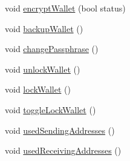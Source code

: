 \begin{DoxyCompactItemize}
void \mbox{\hyperlink{class_wallet_frame_a8a9a419ba3e249f29fe321f2d789b761}{encrypt\+Wallet}} (bool status)
\item 
void \mbox{\hyperlink{class_wallet_frame_a76aa3543635fedea052661a4cd44b81d}{backup\+Wallet}} ()
\item 
void \mbox{\hyperlink{class_wallet_frame_a0a4026a734acdc0f5fbd5f775c167443}{change\+Passphrase}} ()
\item 
void \mbox{\hyperlink{class_wallet_frame_a31b6e87c87b383ef53225b6c2b37f057}{unlock\+Wallet}} ()
\item 
void \mbox{\hyperlink{class_wallet_frame_a0b94aa3ff7ae9ea4d3e31b038d8b9b25}{lock\+Wallet}} ()
\item 
void \mbox{\hyperlink{class_wallet_frame_aabe09da444c11859a0fc19e923ce0792}{toggle\+Lock\+Wallet}} ()
\item 
void \mbox{\hyperlink{class_wallet_frame_a7f697d220e7ea40d6e4d6e6c5e9ef3b4}{used\+Sending\+Addresses}} ()
\item 
void \mbox{\hyperlink{class_wallet_frame_a9273a0b98cf7ec9fc344658c38a4a0a3}{used\+Receiving\+Addresses}} ()
\end{DoxyCompactItemize}
